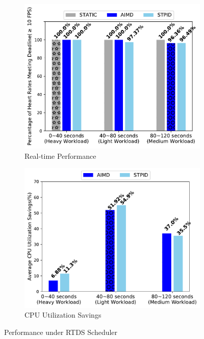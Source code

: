 \begin{figure}[t!]
\centering

\begin{subfigure}{.45\textwidth}
    \centering
    \includegraphics[width=1\linewidth]{images/1vm_rtds_fps}
    \caption{Real-time Performance}
    \label{1vm_rtds_fps}
\end{subfigure}
\begin{subfigure}{.45\textwidth}
    \centering
    \includegraphics[width=1\linewidth]{images/1vm_rtds_cpu}
    \caption{CPU Utilization Savings}
    \label{1vm_rtds_cpu}
\end{subfigure}%
\captionsetup{justification=centering}
\caption{Performance under RTDS Scheduler}
\label{1vm_rtds}
\end{figure}




